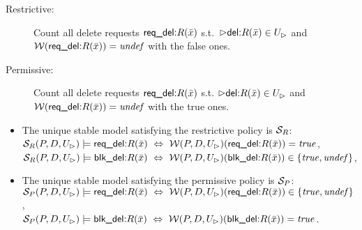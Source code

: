 \documentclass[twoside,11pt]{article}
\theoremstyle{lines}
\theoremstyle{longplain}
\def\rdel{\itorsf{req\_del:}}
\def\bdel{\itorsf{blk\_del:}}
\begin{document}
\begin{description}
\item[Restrictive:]
  Count all delete requests $\rdel R(\bar x)$ s.t.\
  $\extev \del R(\bar x) \in U_\rhd$ and
  $\pl W(\rdel R(\bar x)) = \undef$ with the false ones.
\item[Permissive:]
  Count all delete requests $\rdel R(\bar x)$ s.t.
  $\extev \del R(\bar x) \in U_\rhd$ and
  $\pl W(\rdel R(\bar x)) = \undef$ with the true ones.
\end{description}

\begin{Theorem}\label{theo:AreStableModels}
\begin{itemize}
\item
  The unique stable model satisfying the restrictive policy is $\mathcal S_R$: \\
  $\pl S_R(P,D,U_\rhd) \models \rdel R(\bar x) \Iff
   \pl W(P,D,U_\rhd)(\rdel R(\bar x)) = \true$, \\
  $\pl S_R(P,D,U_\rhd) \models \bdel R(\bar x) \Iff
   \pl W(P,D,U_\rhd)(\bdel R(\bar x)) \in \{\true,\undef\}$,
\item
  The unique stable model satisfying the permissive policy is $\mathcal S_P$: \\
  $\pl S_P(P,D,U_\rhd) \models \rdel R(\bar x) \Iff
   \pl W(P,D,U_\rhd)(\rdel R(\bar x)) \in \{\true,\undef\}$, \\
  $\pl S_P(P,D,U_\rhd) \models \bdel R(\bar x) \Iff
   \pl W(P,D,U_\rhd)(\bdel R(\bar x)) = \true$.
\end{itemize}
\end{Theorem}
\end{document}
